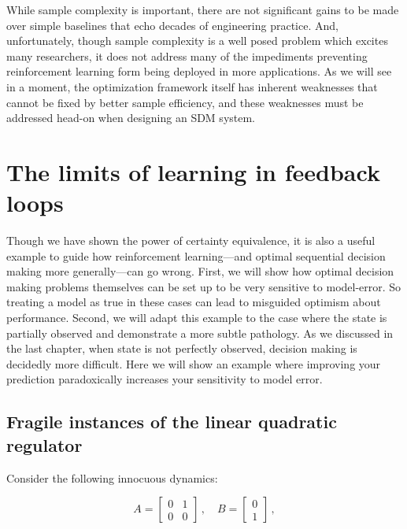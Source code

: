 \documentclass{tufte-book}
\begin{document}
While sample complexity is important, there are not significant gains to
be made over simple baselines that echo decades of engineering practice.
And, unfortunately, though sample complexity is a well posed problem
which excites many researchers, it does not address many of the
impediments preventing reinforcement learning form being deployed in
more applications. As we will see in a moment, the optimization
framework itself has inherent weaknesses that cannot be fixed by better
sample efficiency, and these weaknesses must be addressed head-on when
designing an SDM system.

\hypertarget{the-limits-of-learning-in-feedback-loops}{%
\section{The limits of learning in feedback
loops}\label{the-limits-of-learning-in-feedback-loops}}

Though we have shown the power of certainty equivalence, it is also a
useful example to guide how reinforcement learning---and optimal
sequential decision making more generally---can go wrong. First, we will
show how optimal decision making problems themselves can be set up to be
very sensitive to model-error. So treating a model as true in these
cases can lead to misguided optimism about performance. Second, we will
adapt this example to the case where the state is partially observed and
demonstrate a more subtle pathology. As we discussed in the last
chapter, when state is not perfectly observed, decision making is
decidedly more difficult. Here we will show an example where improving
your prediction paradoxically increases your sensitivity to model error.

\hypertarget{fragile-instances-of-the-linear-quadratic-regulator}{%
\subsection{Fragile instances of the linear quadratic
regulator}\label{fragile-instances-of-the-linear-quadratic-regulator}}


Consider the following innocuous dynamics:

\[
    A = \begin{bmatrix} 0 & 1\\ 0 & 0\end{bmatrix} \,,\quad B = \begin{bmatrix} 0\\1 \end{bmatrix}\,,
\]
\end{document}
